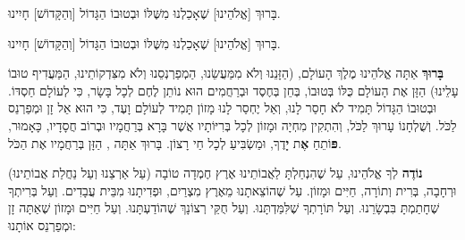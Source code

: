 בָּרוּךְ [אֱלֹהֵינוּ] שֶׁאָכַלְנוּ מִשֶּׁלּוֹ וּבְטוּבוֹ הַגָּדוֹל [וְהַקָּדוֹשׁ] חָיִינוּ.

בָּרוּךְ [אֱלֹהֵינוּ] שֶׁאָכַלְנוּ מִשֶּׁלּוֹ וּבְטוּבוֹ הַגָּדוֹל [וְהַקָּדוֹשׁ] חָיִינוּ.

\divider

\textbf{בָּרוּךְ} אַתָּה \Shem{} אֱלֹהֵינוּ מֶלֶךְ הָעוֹלָם, (הַזָּנֵנוּ וְלֹא מִמַּעֲשֵׂנוּ, הַמְפַרְנְסֵנוּ וְלֹא מִצִּדְקוֹתֵינוּ, הַמַּעֲדִיף טוּבוֹ עָלֵינוּ) הַזָּן אֶת הָעוֹלָם כֻּלּוֹ בְּטוּבוֹ, בְּחֵן בְּחֶסֶד וּבְרַחֲמִים הוּא נוֹתֵן לֶחֶם לְכָל בָּשָׂר, כִּי לְעוֹלָם חַסְדּוֹ. וּבְטוּבוֹ הַגָּדוֹל תָּמִיד לֹא חָסַר לָנוּ, וְאַל יֶחְסַר לָנוּ מָזוֹן תָּמִיד לְעוֹלָם וָעֶד, כִּי הוּא אֵל זָן וּמְפַרְנֵס לַכֹּל. וְשֻׁלְחָנוֹ עָרוּךְ לַכֹּל, וְהִתְקִין מִחְיָה וּמָזוֹן לְכָל בְּרִיּוֹתָיו אֲשֶׁר בָּרָא בְּרַחֲמָיו וּבְרוֹב חֲסָדָיו, כָּאָמוּר, \textbf{פּ}וֹתֵחַ \textbf{אֶ}ת \textbf{יָ}דֶךָ, וּמַשְׂבִּיעַ לְכָל חַי רָצוֹן. בָּרוּךְ אַתָּה \Shem{}, הַזָּן בְּרַחֲמָיו אֶת הַכֹּל.

(עַל אַרְצֵנוּ וְעַל נַחֲלַת אֲבוֹתֵינוּ) \textbf{נוֹדֶה} לְךָ \Shem{} אֱלֹהֵינוּ, עַל שֶׁהִנְחַלְתָּ לַאֲבוֹתֵינוּ אֶרֶץ חֶמְדָה טוֹבָה וּרְחָבָה, בְּרִית וְתוֹרָה, חַיִּים וּמָזוֹן. עַל שֶׁהוֹצֵאתָנוּ מֵאֶרֶץ מִצְרַיִם, וּפְדִיתָנוּ מִבֵּית עֲבָדִים. וְעַל בְּרִיתְךָ שֶׁחָתַמְתָּ בִּבְשָׂרֵנוּ. וְעַל תּוֹרָתְךָ שֶׁלִּמַּדְתָּנוּ. וְעַל חֻקֵּי רְצוֹנָךְ שֶׁהוֹדַעְתָּנוּ. וְעַל חַיִּים וּמָזוֹן שֶׁאַתָּה זָן וּמְפַרְנֵס אוֹתָנוּ:

